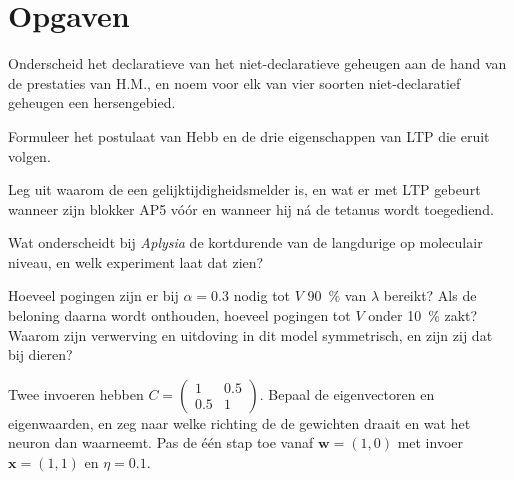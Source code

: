 \section{Opgaven}

\begin{exercise}[$\star$]\label{exo:b3:learning-memory:1}
Onderscheid het declaratieve van het niet-declaratieve geheugen aan de
hand van de prestaties van H.M., en noem voor elk van vier soorten
niet-declaratief geheugen een hersengebied.
\end{exercise}

\begin{exercise}[$\star$]\label{exo:b3:learning-memory:2}
Formuleer het postulaat van Hebb en de drie eigenschappen van LTP die
eruit volgen.
\end{exercise}

\begin{exercise}[$\star$]\label{exo:b3:learning-memory:3}
Leg uit waarom de  een gelijktijdigheidsmelder is, en wat
er met LTP gebeurt wanneer zijn blokker AP5 vóór en wanneer hij ná de
tetanus wordt toegediend.
\end{exercise}

\begin{exercise}[$\star$]\label{exo:b3:learning-memory:4}
Wat onderscheidt bij \emph{Aplysia} de kortdurende van de langdurige
 op moleculair niveau, en welk experiment laat dat zien?
\end{exercise}

\begin{exercise}[$\star\star$]\label{exo:b3:learning-memory:5}
Hoeveel pogingen zijn er bij $\alpha = 0.3$ nodig tot $V$ \qty{90}{\%}
van $\lambda$ bereikt? Als de beloning daarna wordt onthouden, hoeveel
pogingen tot $V$ onder \qty{10}{\%} zakt? Waarom zijn verwerving en
uitdoving in dit model symmetrisch, en zijn zij dat bij dieren?
\end{exercise}

\begin{exercise}[$\star\star$]\label{exo:b3:learning-memory:6}
Twee invoeren hebben $C = \begin{pmatrix}1 & 0.5\\ 0.5 & 1\end{pmatrix}$.
Bepaal de eigenvectoren en eigenwaarden, en zeg naar welke richting de
 de gewichten draait en wat het neuron dan waarneemt. Pas
de  één stap toe vanaf $\mathbf{w} = (1,0)$ met invoer $\mathbf{x}
= (1,1)$ en $\eta = 0.1$.
\end{exercise}

